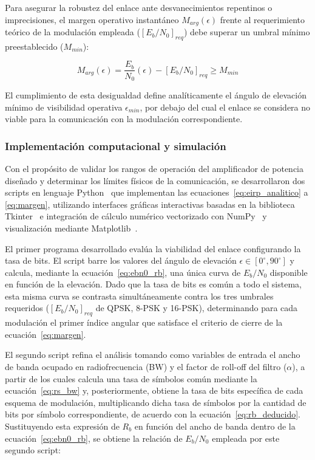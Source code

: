 Para asegurar la robustez del enlace ante desvanecimientos repentinos o imprecisiones, el margen operativo instantáneo $M_{arg}(\epsilon)$ frente al requerimiento teórico de la modulación empleada ($[E_b/N_0]_{req}$) debe superar un umbral mínimo preestablecido ($M_{min}$):

\begin{equation}
    M_{arg}(\epsilon) = \frac{E_b}{N_0}(\epsilon) - [E_b/N_0]_{req} \ge M_{min}
    \label{eq:margen}
\end{equation}

El cumplimiento de esta desigualdad define analíticamente el ángulo de elevación mínimo de visibilidad operativa $\epsilon_{min}$, por debajo del cual el enlace se considera no viable para la comunicación con la modulación correspondiente.

\subsubsection{Implementación computacional y simulación}
Con el propósito de validar los rangos de operación del amplificador de potencia diseñado y determinar los límites físicos de la comunicación, se desarrollaron dos scripts en lenguaje Python~\cite{python} que implementan las ecuaciones~\eqref{eq:eirp_analitico} a \eqref{eq:margen}, utilizando interfaces gráficas interactivas basadas en la biblioteca Tkinter~\cite{tkinter} e integración de cálculo numérico vectorizado con NumPy~\cite{numpy} y visualización mediante Matplotlib~\cite{matplotlib}.

El primer programa desarrollado evalúa la viabilidad del enlace configurando la tasa de bits. El script barre los valores del ángulo de elevación $\epsilon \in [0^\circ, 90^\circ]$ y calcula, mediante la ecuación~\eqref{eq:ebn0_rb}, una única curva de $E_b/N_0$ disponible en función de la elevación. Dado que la tasa de bits es común a todo el sistema, esta misma curva se contrasta simultáneamente contra los tres umbrales requeridos ($[E_b/N_0]_{req}$ de QPSK, 8-PSK y 16-PSK), determinando para cada modulación el primer índice angular que satisface el criterio de cierre de la ecuación~\eqref{eq:margen}.

El segundo script refina el análisis tomando como variables de entrada el ancho de banda ocupado en radiofrecuencia (BW) y el factor de roll-off del filtro ($\alpha$), a partir de los cuales calcula una tasa de símbolos común mediante la ecuación~\eqref{eq:rs_bw} y, posteriormente, obtiene la tasa de bits específica de cada esquema de modulación, multiplicando dicha tasa de símbolos por la cantidad de bits por símbolo correspondiente, de acuerdo con la ecuación~\eqref{eq:rb_deducido}. Sustituyendo esta expresión de $R_b$ en función del ancho de banda dentro de la ecuación~\eqref{eq:ebn0_rb}, se obtiene la relación de $E_b/N_0$ empleada por este segundo script:

